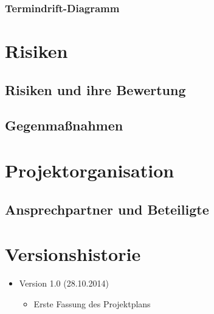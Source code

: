 \documentclass[11pt]{article}
\begin{document}
\subsubsection{Termindrift-Diagramm}

\section{Risiken}

\subsection{Risiken und ihre Bewertung}

\subsection{Gegenmaßnahmen}

\section{Projektorganisation}

\subsection{Ansprechpartner und Beteiligte}

\section{Versionshistorie}

\begin{itemize}
	\item Version 1.0 (28.10.2014)
	\begin{itemize}
		\item Erste Fassung des Projektplans
	\end{itemize}
\end{itemize}
\end{document}
